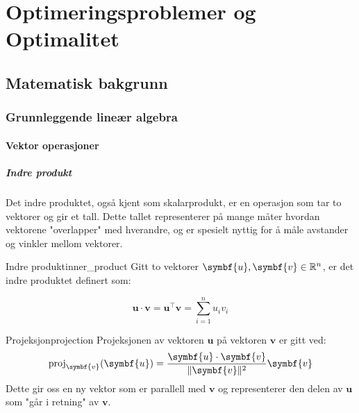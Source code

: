 \part{Optimeringsproblemer og Optimalitet}
\label{part:introduction}

\chapter{Matematisk bakgrunn}
\label{chap:mathematical_background}

\section{Grunnleggende lineær algebra}
\subsection{Vektor operasjoner}

\subsubsection{Indre produkt}
Det indre produktet, også kjent som skalarprodukt, er en operasjon som tar to vektorer og gir et tall. 
Dette tallet representerer på mange måter hvordan vektorene "overlapper" med hverandre, og er spesielt nyttig for å måle avstander og vinkler mellom vektorer.

\begin{definition}{Indre produkt}{inner_product}
	Gitt to vektorer \( \symbf{u}, \symbf{v} \in \R^n \), er det indre produktet definert som:

	\[
		\symbf{u} \cdot \symbf{v} = \symbf{u}^\top \symbf{v} = \sum_{i=1}^{n} u_i v_i
	\]

\end{definition}

\begin{remark}{Projeksjon}{projection}
	Projeksjonen av vektoren \( \symbf{u} \) på vektoren \( \symbf{v} \) er gitt ved:
	\[
		\operatorname{proj}_{\symbf{v}}(\symbf{u}) = \frac{\symbf{u} \cdot \symbf{v}}{\norm{\symbf{v}}^2} \symbf{v}
	\]
	Dette gir oss en ny vektor som er parallell med \( \symbf{v} \) og representerer den delen av \( \symbf{u} \) som "går i retning" av \( \symbf{v} \).
\end{remark}

